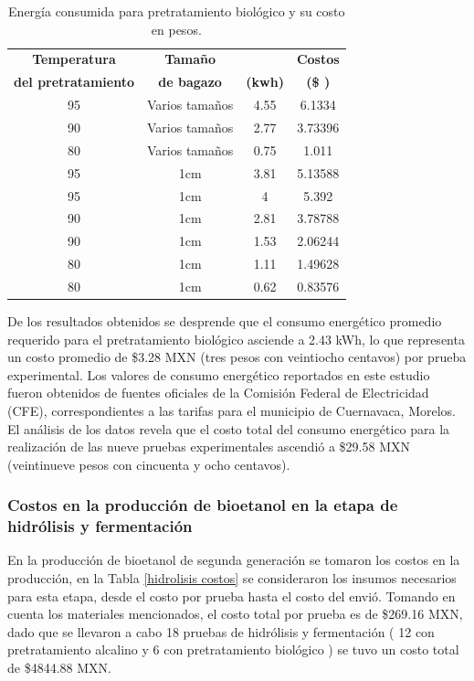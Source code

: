 \documentclass[12pt]{article}
\begin{document}
	
	\begin{table}[H]
		\centering
		\caption{Energía consumida para pretratamiento biológico  y su costo en pesos. }
		\label{tabla de energia}
		\resizebox{12cm}{!} {
		\begin{tabular}{|c|c|c|c|}
			\hline
			\textbf{Temperatura} & \textbf{Tamaño }  & \textbf{
			} & \textbf{Costos } \\ 
			\textbf{del pretratamiento} &	\textbf{ de bagazo}  & 	\textbf{(kwh) }& 	\textbf{(\$ )} \\ \hline
        95 & Varios tamaños & 4.55 & 6.1334  \\ \hline
	90 & Varios tamaños & 2.77 & 3.73396  \\ \hline
	80 & Varios tamaños & 0.75 & 1.011  \\ \hline
	95 & 1cm & 3.81 & 5.13588  \\ \hline
	95 & 1cm & 4 & 5.392  \\ \hline
	90 & 1cm & 2.81 & 3.78788  \\ \hline
	90 & 1cm & 1.53 & 2.06244  \\ \hline
	80 & 1cm & 1.11 & 1.49628  \\ \hline
	80 & 1cm & 0.62 & 0.83576  \\ \hline
			
			
		\end{tabular}}
	
	\end{table}
	
	
De los resultados obtenidos se desprende que el consumo energético promedio requerido para el pretratamiento biológico asciende a 2.43 kWh, lo que representa un costo promedio de \$3.28 MXN (tres pesos con veintiocho centavos) por prueba experimental. Los valores de consumo energético reportados en este estudio fueron obtenidos de fuentes oficiales de la Comisión Federal de Electricidad (CFE), correspondientes a las tarifas para el municipio de Cuernavaca, Morelos. El análisis de los datos revela que el costo total del consumo energético para la realización de las nueve pruebas experimentales ascendió a \$29.58 MXN (veintinueve pesos con cincuenta y ocho centavos).
	
	\subsubsection{Costos en la producción de bioetanol en la etapa de hidrólisis y fermentación}
	
	En la producción de bioetanol de segunda generación se tomaron los costos en la producción, en la Tabla \ref{hidrolisis costos} se consideraron los insumos necesarios para esta etapa, desde el costo por prueba hasta el costo del envió. Tomando en cuenta los materiales mencionados, el costo total por prueba es de \$269.16 MXN, dado que se llevaron a cabo 18 pruebas de hidrólisis y fermentación ( 12 con pretratamiento alcalino y 6 con pretratamiento biológico ) se tuvo un costo total de \$4844.88 MXN.
	
\end{document}

